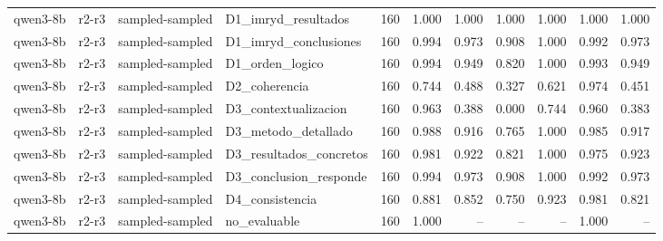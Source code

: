 \begin{table}
\begin{tabular}{llllrrrrrrr}
qwen3-8b & r2-r3 & sampled-sampled & D1\_imryd\_resultados & 160 & 1.000 & 1.000 & 1.000 & 1.000 & 1.000 & 1.000 \\
qwen3-8b & r2-r3 & sampled-sampled & D1\_imryd\_conclusiones & 160 & 0.994 & 0.973 & 0.908 & 1.000 & 0.992 & 0.973 \\
qwen3-8b & r2-r3 & sampled-sampled & D1\_orden\_logico & 160 & 0.994 & 0.949 & 0.820 & 1.000 & 0.993 & 0.949 \\
qwen3-8b & r2-r3 & sampled-sampled & D2\_coherencia & 160 & 0.744 & 0.488 & 0.327 & 0.621 & 0.974 & 0.451 \\
qwen3-8b & r2-r3 & sampled-sampled & D3\_contextualizacion & 160 & 0.963 & 0.388 & 0.000 & 0.744 & 0.960 & 0.383 \\
qwen3-8b & r2-r3 & sampled-sampled & D3\_metodo\_detallado & 160 & 0.988 & 0.916 & 0.765 & 1.000 & 0.985 & 0.917 \\
qwen3-8b & r2-r3 & sampled-sampled & D3\_resultados\_concretos & 160 & 0.981 & 0.922 & 0.821 & 1.000 & 0.975 & 0.923 \\
qwen3-8b & r2-r3 & sampled-sampled & D3\_conclusion\_responde & 160 & 0.994 & 0.973 & 0.908 & 1.000 & 0.992 & 0.973 \\
qwen3-8b & r2-r3 & sampled-sampled & D4\_consistencia & 160 & 0.881 & 0.852 & 0.750 & 0.923 & 0.981 & 0.821 \\
qwen3-8b & r2-r3 & sampled-sampled & no\_evaluable & 160 & 1.000 & -- & -- & -- & 1.000 & -- \\
\bottomrule
\end{tabular}
\end{table}
